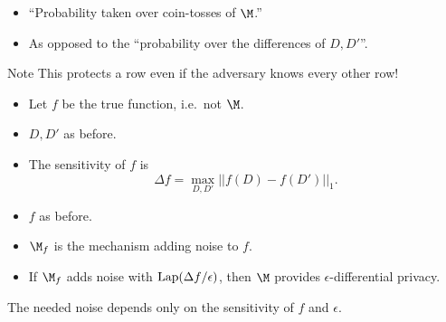 \begin{frame}
  \begin{remark}
    \begin{itemize}
      \item \enquote{Probability taken over coin-tosses of \(\M\).}
      \item As opposed to the \enquote{probability over the differences of \(D, 
            D'\)}.
    \end{itemize}
  \end{remark}
\end{frame}

\begin{frame}
  \begin{block}{Note}
    This protects a row even if the adversary knows every other row!
  \end{block}
\end{frame}

\begin{frame}
  \begin{definition}[Sensitivity]
    \begin{itemize}
      \item Let \(f\) be the true function, i.e.\ not \(\M\).
      \item \(D, D'\) as before.
      \item The sensitivity of \(f\) is \[
          \Delta f = \max_{D, D'} || f(D) - f(D') ||_{1}.
        \]
    \end{itemize}
  \end{definition}
\end{frame}

\begin{frame}
  \begin{theorem}
    \begin{itemize}
      \item \(f\) as before.
      \item \(\M_f\) is the mechanism adding noise to \(f\).

        \pause

      \item If \(\M_f\) adds noise with \(\operatorname{Lap}(\Delta f/\epsilon)\),
        then \(\M\) provides \(\epsilon\)-differential privacy.
    \end{itemize}
  \end{theorem}

  \pause

  \begin{remark}
    The needed noise depends only on the sensitivity of \(f\) and \(\epsilon\).
  \end{remark}
\end{frame}

